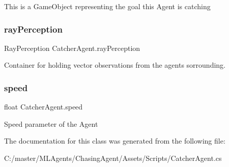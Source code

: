 This is a Game\+Object representing the goal this Agent is catching 

\mbox{\label{class_catcher_agent_af0211765225d989587ca410ac3124662}} 
\subsubsection{\texorpdfstring{rayPerception}{rayPerception}}
{\footnotesize\ttfamily Ray\+Perception Catcher\+Agent.\+ray\+Perception\hspace{0.3cm}{\ttfamily [private]}}



Container for holding vector observations from the agents sorrounding. 

\mbox{\label{class_catcher_agent_a90d294825b74176926dfee484ab56af8}} 
\subsubsection{\texorpdfstring{speed}{speed}}
{\footnotesize\ttfamily float Catcher\+Agent.\+speed}



Speed parameter of the Agent 



The documentation for this class was generated from the following file\+:\begin{DoxyCompactItemize}
\item 
C\+:/master/\+M\+L\+Agents/\+Chasing\+Agent/\+Assets/\+Scripts/Catcher\+Agent.\+cs\end{DoxyCompactItemize}
